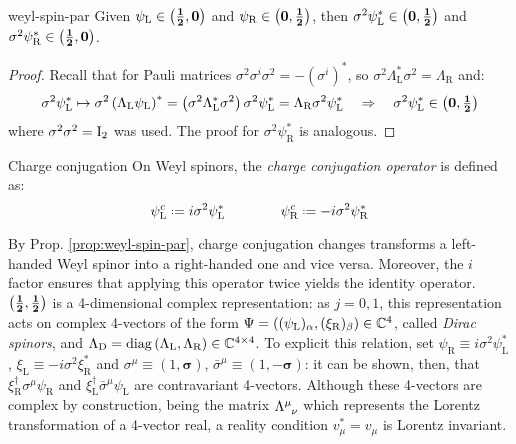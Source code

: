 \begin{proposition}{}{weyl-spin-par}
  Given $ \psi_\text{L} \in \mathbf{\left( \frac{1}{2},0 \right)} $ and $ \psi_\text{R} \in \mathbf{\left( 0,\frac{1}{2} \right)} $, then $ \sigma^2 \psi_\text{L}^* \in \mathbf{\left( 0,\frac{1}{2} \right)} $ and $ \sigma^2 \psi_\text{R}^* \in \mathbf{\left( \frac{1}{2},0 \right)} $.

  \tcblower

  \begin{proof}
    Recall that for Pauli matrices $ \sigma^2 \sigma^i \sigma^2 = -(\sigma^i)^* $, so $ \sigma^2 \Lambda_\text{L}^* \sigma^2 = \Lambda_\text{R} $ and:
    \begin{equation*}
      \sigma^2 \psi_\text{L}^* \mapsto \sigma^2 \left( \Lambda_\text{L} \psi_\text{L} \right)^* = \left( \sigma^2 \Lambda_\text{L}^* \sigma^2 \right) \sigma^2 \psi_\text{L}^* = \Lambda_\text{R} \sigma^2 \psi_\text{L}^*
      \quad \Rightarrow \quad
      \sigma^2 \psi_\text{L}^* \in \mathbf{\left( 0,\tfrac{1}{2} \right)}
    \end{equation*}
    where $ \sigma^2 \sigma^2 = \mathrm{I}_2 $ was used. The proof for $ \sigma^2 \psi_\text{R}^* $ is analogous.
  \end{proof}
\end{proposition}

\begin{definition}{Charge conjugation}{}
  On Weyl spinors, the \textit{charge conjugation operator} is defined as:
  \begin{equation}
    \psi_\text{L}^c \defeq i \sigma^2 \psi_\text{L}^*
    \qquad \qquad
    \psi_\text{R}^c \defeq -i \sigma^2 \psi_\text{R}^*
    \label{eq:1.42}
  \end{equation}
\end{definition}

By Prop. \ref{prop:weyl-spin-par}, charge conjugation changes transforms a left-handed Weyl spinor into a right-handed one and vice versa. Moreover, the $ i $ factor ensures that applying this operator twice yields the identity operator.\\
$ \mathbf{\left( \frac{1}{2},\frac{1}{2} \right)} $ is a 4-dimensional complex representation: as $ j = 0,1 $, this representation acts on complex 4-vectors of the form $ \Psi = \left( (\psi_\text{L})_\alpha, (\xi_\text{R})_\beta \right) \in \mathbb{C}^4 $, called \textit{Dirac spinors}, and $ \Lambda_\text{D} = \operatorname{diag} \left( \Lambda_\text{L}, \Lambda_\text{R} \right) \in \mathbb{C}^{4 \times 4} $. To explicit this relation, set $ \psi_\text{R} \equiv i \sigma^2 \psi_\text{L}^* $, $ \xi_\text{L} \equiv -i \sigma^2 \xi_\text{R}^* $ and $ \sigma^\mu \equiv \left( 1, \boldsymbol{\sigma} \right) $, $ \bar\sigma^\mu \equiv \left( 1, -\boldsymbol{\sigma} \right) $: it can be shown, then, that $ \xi_\text{R}^\dagger \sigma^\mu \psi_\text{R} $ and $ \xi_\text{L}^\dagger \bar\sigma^\mu \psi_\text{L} $ are contravariant 4-vectors. Although these 4-vectors are complex by construction, being the matrix $ \tensor{\Lambda}{^\mu_\nu} $ which represents the Lorentz transformation of a 4-vector real, a reality condition $ v_\mu^* = v_\mu $ is Lorentz invariant.

